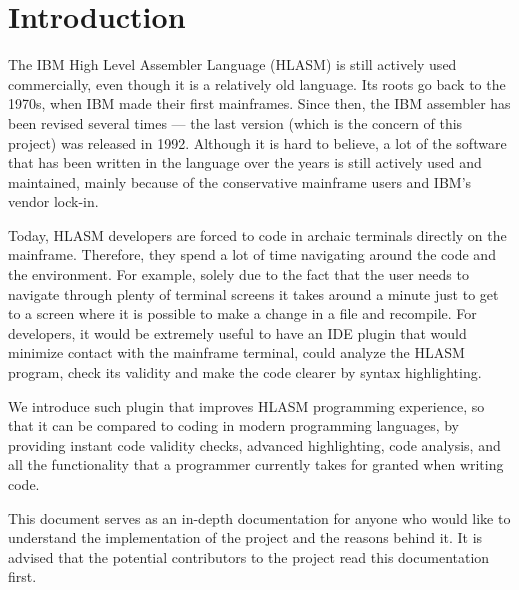 \chapter{Introduction}

The IBM High Level Assembler Language (HLASM) is still actively used commercially, even though it is a relatively old language. Its roots go back to the 1970s, when IBM made their first mainframes. Since then, the IBM assembler has been revised several times --- the last version (which is the concern of this project) was released in 1992. Although it is hard to believe, a lot of the software that has been written in the language over the years is still actively used and maintained, mainly because of the conservative mainframe users and IBM's vendor lock-in.

Today, HLASM developers are forced to code in archaic terminals directly on the mainframe. Therefore, they spend a lot of time navigating around the code and the environment. For example, solely due to the fact that the user needs to navigate through plenty of terminal screens it takes around a minute just to get to a screen where it is possible to make a change in a file and recompile. For developers, it would be extremely useful to have an IDE plugin that would minimize contact with the mainframe terminal, could analyze the HLASM program, check its validity and make the code clearer by syntax highlighting. 

We introduce such plugin that improves HLASM programming experience, so that it can be compared to coding in modern programming languages, by providing instant code validity checks, advanced highlighting, code analysis, and all the functionality that a programmer currently takes for granted when writing code.

This document serves as an in-depth documentation for anyone who would like to understand the implementation of the project and the reasons behind it. It is advised that the potential contributors to the project read this documentation first.

